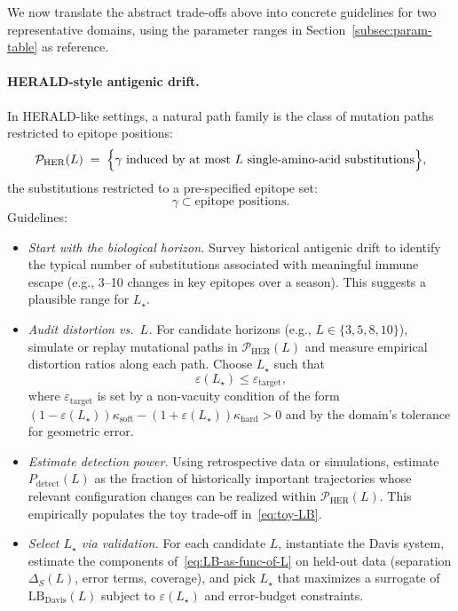 \documentclass[11pt]{article}
\theoremstyle{remark}
\theoremstyle{plain}
\begin{document}
We now translate the abstract trade-offs above into concrete guidelines for two representative
domains, using the parameter ranges in Section~\ref{subsec:param-table} as reference.

\paragraph{HERALD-style antigenic drift.}
In HERALD-like settings, a natural path family is the class of mutation paths restricted to
epitope positions:
\[
\mathcal{P}_{\mathrm{HER}}(L)
\;=\;
\Bigl\{ \gamma \text{ induced by at most $L$ single-amino-acid substitutions} \Bigr\},
\]
the substitutions restricted to a pre-specified epitope set:
\[
\gamma \subset \text{epitope positions}.
\]
Guidelines:
\begin{itemize}[leftmargin=*]
  \item \emph{Start with the biological horizon.} Survey historical antigenic drift to identify the
  typical number of substitutions associated with meaningful immune escape (e.g., 3--10 changes in
  key epitopes over a season). This suggests a plausible range for $L_\star$.

  \item \emph{Audit distortion vs.\ $L$.} For candidate horizons (e.g., $L \in \{3,5,8,10\}$), simulate
  or replay mutational paths in $\mathcal{P}_{\mathrm{HER}}(L)$ and measure empirical distortion
  ratios along each path. Choose $L_\star$ such that
  \[
    \varepsilon(L_\star) \le \varepsilon_{\text{target}},
  \]
  where $\varepsilon_{\text{target}}$ is set by a non-vacuity condition of the form
  $(1-\varepsilon(L_\star))\kappa_{\mathrm{soft}} - (1+\varepsilon(L_\star))\kappa_{\mathrm{hard}} > 0$ and by the domain’s tolerance for geometric error.

  \item \emph{Estimate detection power.} Using retrospective data or simulations, estimate
  $P_{\mathrm{detect}}(L)$ as the fraction of historically important trajectories whose relevant
  configuration changes can be realized within $\mathcal{P}_{\mathrm{HER}}(L)$. This empirically populates
  the toy trade-off in~\eqref{eq:toy-LB}.

  \item \emph{Select $L_\star$ via validation.} For each candidate $L$, instantiate the Davis
  system, estimate the components of~\eqref{eq:LB-as-func-of-L} on held-out data (separation
  $\Delta_S(L)$, error terms, coverage), and pick $L_\star$ that maximizes a surrogate of
  $\mathrm{LB}_{\text{Davis}}(L)$ subject to $\varepsilon(L_\star)$ and error-budget constraints.
\end{itemize}
\end{document}
